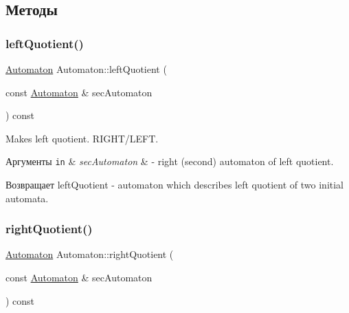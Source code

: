 \subsection{Методы}
\mbox{\label{classautomaton_1_1_automaton_ab6ffe327d6e520f3d3c8bdf5170e53d6}} 
\subsubsection{\texorpdfstring{left\+Quotient()}{leftQuotient()}}
{\footnotesize\ttfamily \mbox{\hyperlink{classautomaton_1_1_automaton}{Automaton}} Automaton\+::left\+Quotient (\begin{DoxyParamCaption}\item[{const \mbox{\hyperlink{classautomaton_1_1_automaton}{Automaton}} \&}]{sec\+Automaton }\end{DoxyParamCaption}) const}



Makes left quotient. R\+I\+G\+H\+T/\+L\+E\+FT. 


\begin{DoxyParams}[1]{Аргументы}
\mbox{\tt in}  & {\em sec\+Automaton} & -\/ right (second) automaton of left quotient. \\
\hline
\end{DoxyParams}
\begin{DoxyReturn}{Возвращает}
left\+Quotient -\/ automaton which describes left quotient of two initial automata. 
\end{DoxyReturn}
\mbox{\label{classautomaton_1_1_automaton_a3e997b515536e08f97e3fef599e51d8f}} 
\subsubsection{\texorpdfstring{right\+Quotient()}{rightQuotient()}}
{\footnotesize\ttfamily \mbox{\hyperlink{classautomaton_1_1_automaton}{Automaton}} Automaton\+::right\+Quotient (\begin{DoxyParamCaption}\item[{const \mbox{\hyperlink{classautomaton_1_1_automaton}{Automaton}} \&}]{sec\+Automaton }\end{DoxyParamCaption}) const}



